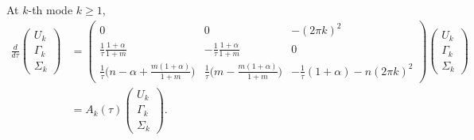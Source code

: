 \documentclass[a4paper,11pt]{article}
\theoremstyle{remark}
\begin{document}
At $k$-th mode $k\ge1$,
\begin{align}
  \frac{d}{d\tau}
  \begin{pmatrix}
   U_k \\ \Gamma_k \\ \Sigma_k
  \end{pmatrix} &= 
  \begin{pmatrix}
   0 & 0 & -(2\pi k)^2\\
   \frac{1}{\tau}\frac{1+\alpha}{1+m} & -\frac{1}{\tau}\frac{1+\alpha}{1+m} & 0\\
   \frac{1}{\tau}\Big( n-\alpha + \frac{m(1+\alpha)}{1+m}\Big) &
   \frac{1}{\tau}\Big(m - \frac{m(1+\alpha)}{1+m}\Big) &
   -\frac{1}{\tau}(1+\alpha) -n(2\pi k)^2
  \end{pmatrix}
  \begin{pmatrix}
   U_k \\ \Gamma_k \\ \Sigma_k
  \end{pmatrix} \nonumber\\
  &=A_k(\tau)\begin{pmatrix}
   U_k \\ \Gamma_k \\ \Sigma_k
  \end{pmatrix}.  \label{eq:k-system}
\end{align}
\end{document}
